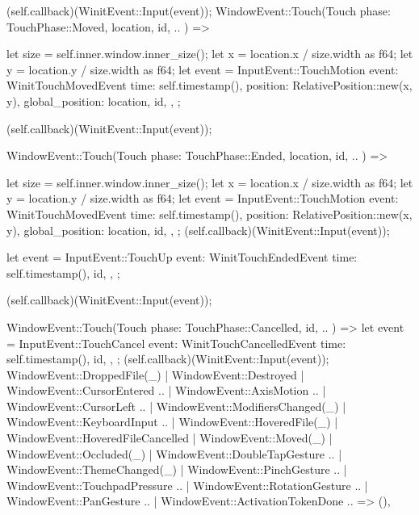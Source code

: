 {{{{                (self.callback)(WinitEvent::Input(event));
            }
            WindowEvent::Touch(Touch {
                phase: TouchPhase::Moved,
                location,
                id,
                ..
            }) => {
                let size = self.inner.window.inner_size();
                let x = location.x / size.width as f64;
                let y = location.y / size.width as f64;
                let event = InputEvent::TouchMotion {
                    event: WinitTouchMovedEvent {
                        time: self.timestamp(),
                        position: RelativePosition::new(x, y),
                        global_position: location,
                        id,
                    },
                };

                (self.callback)(WinitEvent::Input(event));
            }

            WindowEvent::Touch(Touch {
                phase: TouchPhase::Ended,
                location,
                id,
                ..
            }) => {
                let size = self.inner.window.inner_size();
                let x = location.x / size.width as f64;
                let y = location.y / size.width as f64;
                let event = InputEvent::TouchMotion {
                    event: WinitTouchMovedEvent {
                        time: self.timestamp(),
                        position: RelativePosition::new(x, y),
                        global_position: location,
                        id,
                    },
                };
                (self.callback)(WinitEvent::Input(event));

                let event = InputEvent::TouchUp {
                    event: WinitTouchEndedEvent {
                        time: self.timestamp(),
                        id,
                    },
                };

                (self.callback)(WinitEvent::Input(event));
            }

            WindowEvent::Touch(Touch {
                phase: TouchPhase::Cancelled,
                id,
                ..
            }) => {
                let event = InputEvent::TouchCancel {
                    event: WinitTouchCancelledEvent {
                        time: self.timestamp(),
                        id,
                    },
                };
                (self.callback)(WinitEvent::Input(event));
            }
            WindowEvent::DroppedFile(_)
            | WindowEvent::Destroyed
            | WindowEvent::CursorEntered { .. }
            | WindowEvent::AxisMotion { .. }
            | WindowEvent::CursorLeft { .. }
            | WindowEvent::ModifiersChanged(_)
            | WindowEvent::KeyboardInput { .. }
            | WindowEvent::HoveredFile(_)
            | WindowEvent::HoveredFileCancelled
            | WindowEvent::Moved(_)
            | WindowEvent::Occluded(_)
            | WindowEvent::DoubleTapGesture { .. }
            | WindowEvent::ThemeChanged(_)
            | WindowEvent::PinchGesture { .. }
            | WindowEvent::TouchpadPressure { .. }
            | WindowEvent::RotationGesture { .. }
            | WindowEvent::PanGesture { .. }
            | WindowEvent::ActivationTokenDone { .. } => (),
        }
    }
}

